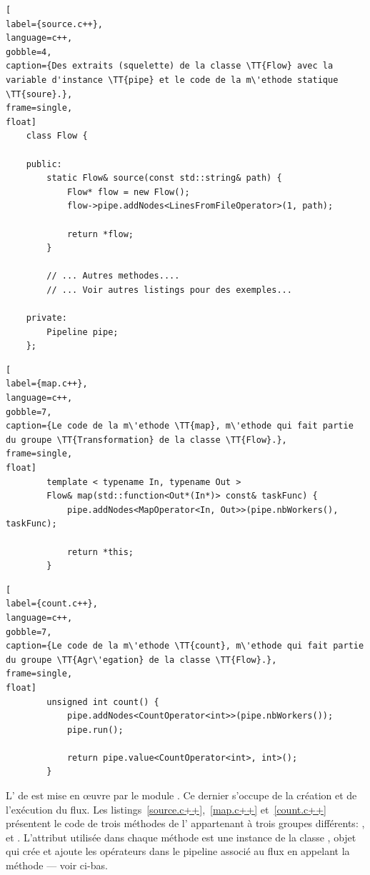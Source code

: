 \begin{lstlisting}[
label={source.c++},
language=c++,
gobble=4,
caption={Des extraits (squelette) de la classe \TT{Flow} avec la variable d'instance \TT{pipe} et le code de la m\'ethode statique \TT{soure}.},
frame=single,
float]
    class Flow {

    public:
        static Flow& source(const std::string& path) {
            Flow* flow = new Flow();
            flow->pipe.addNodes<LinesFromFileOperator>(1, path);

            return *flow;
        }

        // ... Autres methodes....
        // ... Voir autres listings pour des exemples...

    private:
        Pipeline pipe;
    };
\end{lstlisting}


\begin{lstlisting}[
label={map.c++},
language=c++,
gobble=7,
caption={Le code de la m\'ethode \TT{map}, m\'ethode qui fait partie du groupe \TT{Transformation} de la classe \TT{Flow}.},
frame=single,
float]
        template < typename In, typename Out >
        Flow& map(std::function<Out*(In*)> const& taskFunc) {
            pipe.addNodes<MapOperator<In, Out>>(pipe.nbWorkers(), taskFunc);

            return *this;
        }
\end{lstlisting}


\begin{lstlisting}[
label={count.c++},
language=c++,
gobble=7,
caption={Le code de la m\'ethode \TT{count}, m\'ethode qui fait partie du groupe \TT{Agr\'egation} de la classe \TT{Flow}.},
frame=single,
float]
        unsigned int count() {
            pipe.addNodes<CountOperator<int>>(pipe.nbWorkers());
            pipe.run();

            return pipe.value<CountOperator<int>, int>();
        }
\end{lstlisting}


L' de  est mise en œuvre par le module . Ce dernier s'occupe de la cr\'eation et de l'ex\'ecution du flux. Les listings~\ref{source.c++},~\ref{map.c++} et~\ref{count.c++} pr\'esentent le code de trois m\'ethodes de l' appartenant \`a trois groupes diff\'erents: ,  et . L'attribut  utilisée dans chaque m\'ethode est une instance de la classe , objet qui cr\'ee et ajoute les op\'erateurs dans le pipeline associ\'e au flux en appelant la m\'ethode  --- voir ci-bas. 

